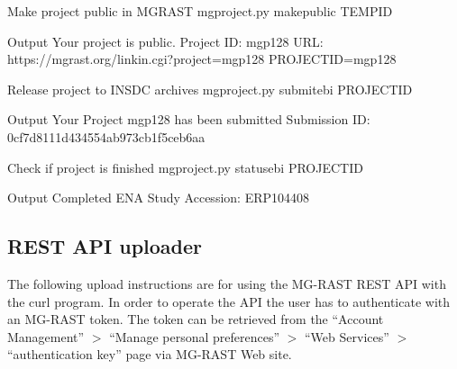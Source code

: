 \documentclass[letterpaper,10pt,english]{sphinxmanual}
\begin{document}
\begin{sphinxVerbatim}[commandchars=\\\{\}]
\PYGZsh{} Make project public in MG\PYGZhy{}RAST
mg\PYGZhy{}project.py make\PYGZhy{}public \PYGZdl{}TEMP\PYGZus{}ID

\PYGZsh{} Output
\PYGZgt{} \PYGZsh{} Your project is public.
\PYGZgt{} Project ID: mgp128
\PYGZgt{} URL: https://mg\PYGZhy{}rast.org/linkin.cgi?project=mgp128
PROJECT\PYGZus{}ID=mgp128

\PYGZsh{} Release project to INSDC archives
mg\PYGZhy{}project.py submit\PYGZhy{}ebi \PYGZdl{}PROJECT\PYGZus{}ID

\PYGZsh{} Output
\PYGZgt{} \PYGZsh{} Your Project mgp128 has been submitted
\PYGZgt{} Submission ID: 0cf7d811\PYGZhy{}1d43\PYGZhy{}4554\PYGZhy{}ab97\PYGZhy{}3cb1f5ceb6aa

\PYGZsh{} Check if project is finished
mg\PYGZhy{}project.py status\PYGZhy{}ebi \PYGZdl{}PROJECT\PYGZus{}ID

\PYGZsh{} Output
\PYGZgt{} Completed
\PYGZgt{} ENA Study Accession: ERP104408
\end{sphinxVerbatim}


\subsection{REST API uploader}
\label{\detokenize{user_manual:rest-api-uploader}}
The following upload instructions are for using the MG-RAST REST API
with the curl program. In order to operate the API the user has to
authenticate with an MG-RAST token. The token can be retrieved from the
“Account Management” \textendash{}\(>\) “Manage personal preferences” \textendash{}\(>\)
“Web Services” \textendash{}\(>\) “authentication key” page via MG-RAST Web
site.
\end{document}
